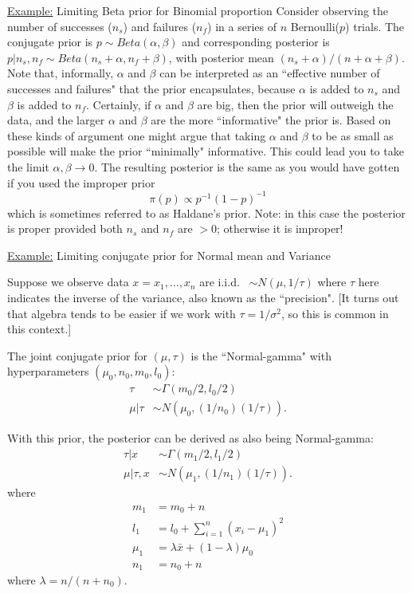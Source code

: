 \documentclass[12pt]{article}
\def\ni{\noindent}
\begin{document}
\ni\underline{Example:} Limiting Beta prior for Binomial proportion
\vskip 2mm
Consider observing the number of successes ($n_s$) and failures ($n_f$)
in a series of $n$ Bernoulli($p$) trials. 
The conjugate prior is $p \sim Beta(\alpha, \beta)$
and corresponding posterior is $p | n_s,n_f \sim Beta(n_s+ \alpha, n_f + \beta)$, with posterior mean $(n_s+\alpha)/(n+\alpha+\beta)$. Note that,
informally, $\alpha$ and $\beta$ can be interpreted as an ``effective number of successes and failures" that the prior encapsulates, because $\alpha$ is added to $n_s$ and $\beta$ is added to $n_f$. Certainly, if $\alpha$ and $\beta$ are big, then the prior will outweigh the data, and the larger $\alpha$ and $\beta$ are the more ``informative" the prior is. Based on these kinds of  argument one might argue that taking $\alpha$ and $\beta$ to be as small as possible will make the prior ``minimally" informative. This could lead you to take the limit $\alpha, \beta \rightarrow 0$. The resulting posterior is the same as you would have gotten if you used the improper prior $$\pi(p) \propto p^{-1} (1-p)^{-1}$$ which is sometimes referred to as Haldane's prior. Note: in this case the posterior is proper provided both $n_s$ and $n_f$ are $>0$; otherwise it is improper!

\ni\underline{Example:} Limiting conjugate prior for Normal mean and Variance
\vskip 2mm

Suppose we observe data $x=x_1,\dots,x_n$ are i.i.d.~ $\sim N(\mu,1/\tau)$ where $\tau$ here indicates the inverse of the variance, also known as the ``precision". [It turns out that algebra tends to be easier if we work with $\tau=1/\sigma^2$, so this is common in this context.]

The joint conjugate prior for $(\mu,\tau)$ is 
the ``Normal-gamma" with hyperparameters $(\mu_0,n_0, m_0,l_0)$:
\begin{align}
\tau  & \sim \Gamma(m_0/2,l_0/2) \\
\mu | \tau  & \sim N\left(\mu_0, (1/n_0) (1/\tau)\right).
\end{align}

With this prior, the posterior can be derived as
also being Normal-gamma:
\begin{align}
\tau | x & \sim \Gamma(m_1/2,l_1/2) \\
\mu | \tau, x & \sim N\left(\mu_1, (1/n_1) (1/\tau) \right).
\end{align}
where 
\begin{align}
m_1 & = m_0+n \\
l_1 & = l_0+ \sum_{i=1}^n (x_i - \mu_1)^2 \\
\mu_1 & = \lambda \bar{x} + (1-\lambda) \mu_0 \\
n_1 & = n_0+n
\end{align}
where $\lambda = n/(n+n_0)$.
\end{document}
